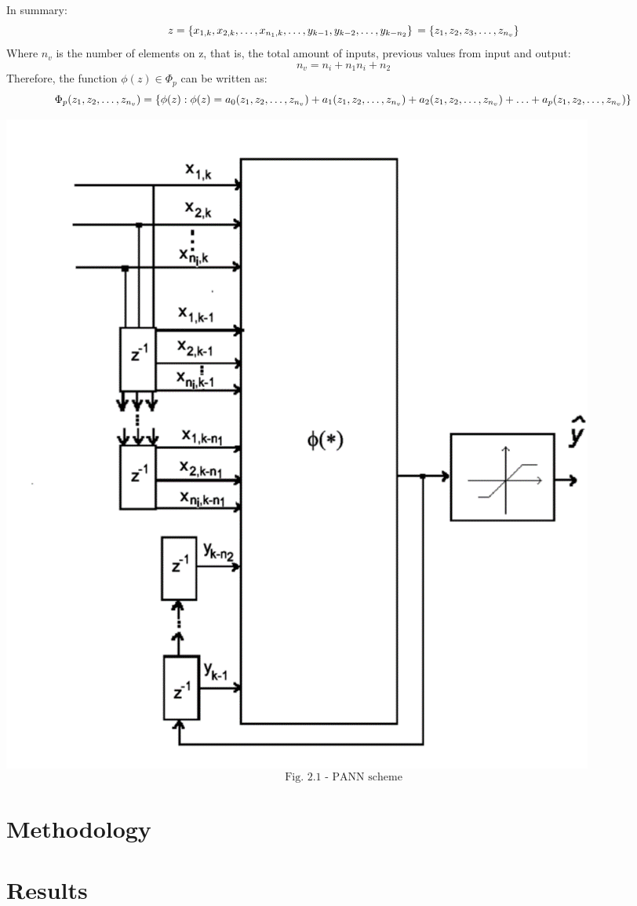\documentclass[conference,final,]{IEEEtran}
\makeatletter
\def\maxwidth{\ifdim\Gin@nat@width>\linewidth\linewidth
\else\Gin@nat@width\fi}
\let\Oldincludegraphics\includegraphics
\renewcommand{\includegraphics}[1]{\Oldincludegraphics[width=\maxwidth]{#1}}
\makeatother
\begin{document}
In summary: \[
z = \left\{x_{1,k}, x_{2,k}, \ldots, x_{n_1,k}, \ldots, y_{k-1}, y_{k-2}, \ldots, y_{k-n_2} \right\} 
\\ = \left\{z_1, z_2, z_3, \ldots, z_{n_v}\right\}
\] Where \(n_v\) is the number of elements on z, that is, the total
amount of inputs, previous values from input and output: \[
n_v = n_i+n_1 n_i + n_2
\] Therefore, the function \(\phi(z) \in \Phi_p\) can be written as: \[
\Phi_p(z_1, z_2, \ldots,z_{n_v}) = \left\{\phi(z): \phi(z) = a_0(z_1, z_2, \ldots,z_{n_v}) + a_1(z_1, z_2, \ldots,z_{n_v}) 
\\ + a_2(z_1, z_2, \ldots,z_{n_v}) + \ldots + a_p(z_1, z_2, \ldots,z_{n_v})\right\}
\]

\includegraphics{../Figures/pann.png} \[
\text{Fig. 2.1 - PANN scheme}
\]

\hypertarget{methodology}{%
\section{Methodology}\label{methodology}}

\hypertarget{results}{%
\section{Results}\label{results}}
\end{document}
